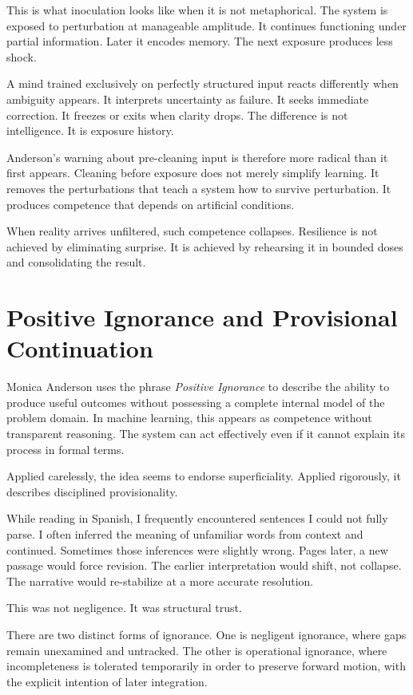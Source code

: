 \documentclass[12pt]{article}
\begin{document}
This is what inoculation looks like when it is not metaphorical. The system is exposed to perturbation at manageable amplitude. It continues functioning under partial information. Later it encodes memory. The next exposure produces less shock.

A mind trained exclusively on perfectly structured input reacts differently when ambiguity appears. It interprets uncertainty as failure. It seeks immediate correction. It freezes or exits when clarity drops. The difference is not intelligence. It is exposure history.

Anderson's warning about pre-cleaning input is therefore more radical than it first appears. Cleaning before exposure does not merely simplify learning. It removes the perturbations that teach a system how to survive perturbation. It produces competence that depends on artificial conditions.

When reality arrives unfiltered, such competence collapses. Resilience is not achieved by eliminating surprise. It is achieved by rehearsing it in bounded doses and consolidating the result.

\section*{Positive Ignorance and Provisional Continuation}

Monica Anderson uses the phrase \emph{Positive Ignorance} to describe the ability to produce useful outcomes without possessing a complete internal model of the problem domain. In machine learning, this appears as competence without transparent reasoning. The system can act effectively even if it cannot explain its process in formal terms.

Applied carelessly, the idea seems to endorse superficiality. Applied rigorously, it describes disciplined provisionality.

While reading in Spanish, I frequently encountered sentences I could not fully parse. I often inferred the meaning of unfamiliar words from context and continued. Sometimes those inferences were slightly wrong. Pages later, a new passage would force revision. The earlier interpretation would shift, not collapse. The narrative would re-stabilize at a more accurate resolution.

This was not negligence. It was structural trust.

There are two distinct forms of ignorance. One is negligent ignorance, where gaps remain unexamined and untracked. The other is operational ignorance, where incompleteness is tolerated temporarily in order to preserve forward motion, with the explicit intention of later integration.
\end{document}
